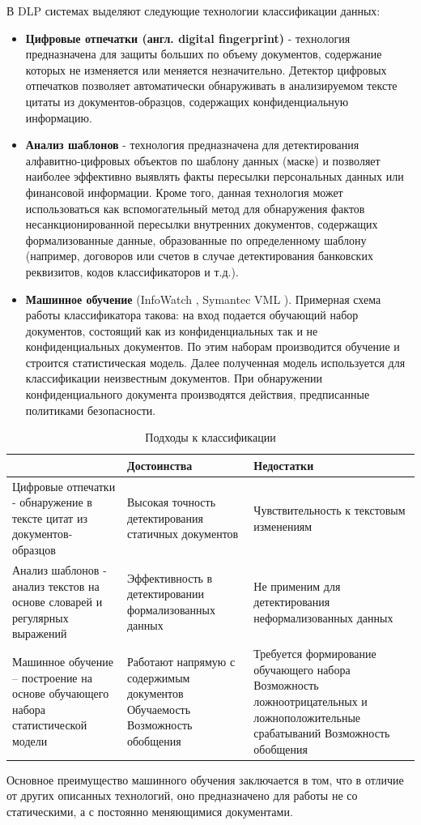 \documentclass[russian, utf8, emptystyle]{eskdtext}
\begin{document}
В DLP системах выделяют следующие технологии классификации данных:
\begin{itemize}
	\item {\bf Цифровые отпечатки (англ. digital fingerprint)} - технология предназначена для защиты больших по объему документов, содержание которых не изменяется или меняется незначительно. Детектор цифровых отпечатков позволяет автоматически обнаруживать в анализируемом тексте цитаты из документов-образцов, содержащих конфиденциальную информацию.
	\item {\bf Анализ шаблонов} - технология предназначена для детектирования алфавитно-цифровых объектов по шаблону данных (маске) и позволяет наиболее эффективно выявлять факты пересылки персональных данных или финансовой информации. Кроме того, данная технология может использоваться как вспомогательный метод для обнаружения фактов несанкционированной пересылки внутренних документов, содержащих формализованные данные, образованные по определенному шаблону (например, договоров или счетов в случае детектирования банковских реквизитов, кодов классификаторов и т.д.).
	\item {\bf Машинное обучение} (InfoWatch \cite{bkf}, Symantec VML \cite{MachLearn}). Примерная схема работы классификатора такова: на вход подается обучающий набор документов, состоящий как из конфиденциальных так и не конфиденциальных документов. По этим наборам производится обучение и строится статистическая модель. Далее полученная модель используется для классификации неизвестным документов. При обнаружении конфиденциального документа производятся действия, предписанные политиками безопасности.
\end{itemize}
\begin{table} 
	\caption{Подходы к классификации}
	\label{tab:far}
	\begin{center}
		\begin{tabular}{|L{5cm}|L{5cm}|L{5cm}|}
			\hline
			& Достоинства & Недостатки \\
			\hline     
			Цифровые отпечатки - обнаружение в тексте цитат из документов-образцов
			& Высокая точность детектирования статичных документов
			& Чувствительность к текстовым изменениям\\
			\hline
			Анализ шаблонов - анализ текстов на основе словарей и регулярных выражений
			& Эффективность в детектировании формализованных данных
			& Не применим для детектирования неформализованных данных\\
			\hline
			Машинное обучение – построение на основе обучающего набора статистической модели
			& Работают напрямую с содержимым документов
			Обучаемость
			Возможность обобщения
			& Требуется формирование обучающего набора
			Возможность ложноотрицательных и ложноположительные срабатываний
			Возможность обобщения \\
			\hline
		\end{tabular}
	\end{center}
\end{table}
Основное преимущество машинного обучения заключается в том, что в отличие от других описанных технологий, оно предназначено для работы не со статическими, а с постоянно меняющимися документами.\\
\end{document}
